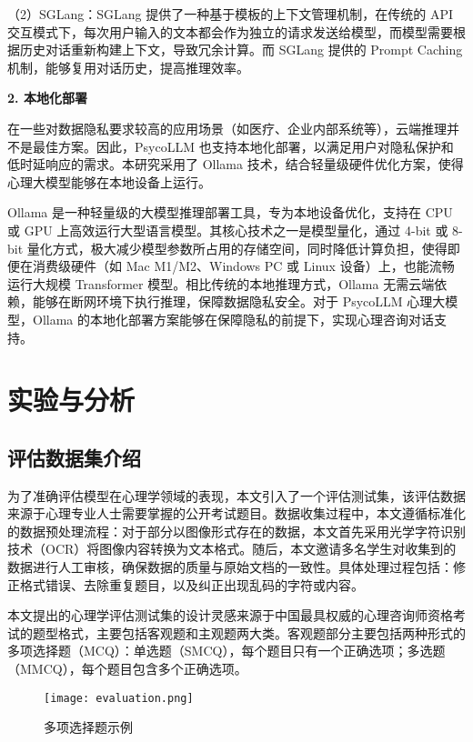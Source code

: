 （2）SGLang：SGLang 提供了一种基于模板的上下文管理机制，在传统的 API 交互模式下，每次用户输入的文本都会作为独立的请求发送给模型，而模型需要根据历史对话重新构建上下文，导致冗余计算。而 SGLang 提供的 Prompt Caching 机制，能够复用对话历史，提高推理效率。

\textbf{2. 本地化部署}

在一些对数据隐私要求较高的应用场景（如医疗、企业内部系统等），云端推理并不是最佳方案。因此，PsycoLLM 也支持本地化部署，以满足用户对隐私保护和低时延响应的需求。本研究采用了 Ollama 技术，结合轻量级硬件优化方案，使得心理大模型能够在本地设备上运行。

Ollama 是一种轻量级的大模型推理部署工具，专为本地设备优化，支持在 CPU 或 GPU 上高效运行大型语言模型。其核心技术之一是模型量化，通过 4-bit 或 8-bit 量化方式，极大减少模型参数所占用的存储空间，同时降低计算负担，使得即便在消费级硬件（如 Mac M1/M2、Windows PC 或 Linux 设备）上，也能流畅运行大规模 Transformer 模型。相比传统的本地推理方式，Ollama 无需云端依赖，能够在断网环境下执行推理，保障数据隐私安全。对于 PsycoLLM 心理大模型，Ollama 的本地化部署方案能够在保障隐私的前提下，实现心理咨询对话支持。

\section{实验与分析}

\subsection{评估数据集介绍}

为了准确评估模型在心理学领域的表现，本文引入了一个评估测试集，该评估数据来源于心理专业人士需要掌握的公开考试题目。数据收集过程中，本文遵循标准化的数据预处理流程：对于部分以图像形式存在的数据，本文首先采用光学字符识别技术（OCR）将图像内容转换为文本格式。随后，本文邀请多名学生对收集到的数据进行人工审核，确保数据的质量与原始文档的一致性。具体处理过程包括：修正格式错误、去除重复题目，以及纠正出现乱码的字符或内容。

本文提出的心理学评估测试集的设计灵感来源于中国最具权威的心理咨询师资格考试的题型格式，主要包括客观题和主观题两大类。客观题部分主要包括两种形式的多项选择题（MCQ）：单选题（SMCQ），每个题目只有一个正确选项；多选题（MMCQ），每个题目包含多个正确选项。

\begin{figure}[ht]
  \centering
  \texttt{[image: evaluation.png]}
  \caption{多项选择题示例}
  \label{fig:evaluation}
\end{figure}

